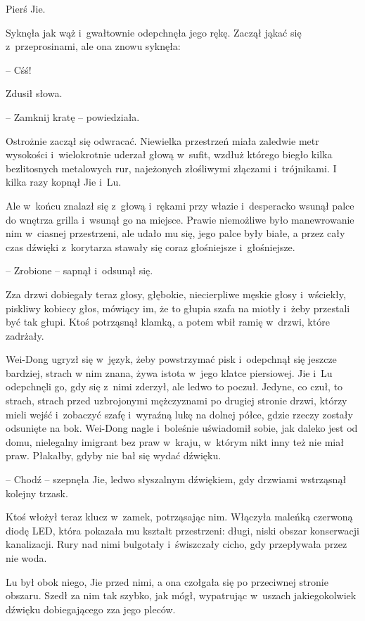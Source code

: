 \documentclass[oneside,polish,11pt,rmheadings]{mwbk}
\begin{document}
Pierś Jie.

Syknęła jak wąż i~gwałtownie odepchnęła jego rękę. Zaczął jąkać się z~przeprosinami, ale ona znowu syknęła: 

-- Cśś!

Zdusił słowa.

-- Zamknij kratę -- powiedziała. 

Ostrożnie zaczął się odwracać. Niewielka przestrzeń miała zaledwie metr wysokości i~wielokrotnie uderzał głową w~sufit, wzdłuż którego biegło kilka bezlitosnych metalowych rur, najeżonych złośliwymi złączami i~trójnikami. I kilka razy kopnął Jie i~Lu.

Ale w~końcu znalazł się z~głową i~rękami przy włazie i~desperacko wsunął palce do wnętrza grilla i~wsunął go na miejsce. Prawie niemożliwe było manewrowanie nim w~ciasnej przestrzeni, ale udało mu się, jego palce były białe, a przez cały czas dźwięki z~korytarza stawały się coraz głośniejsze i~głośniejsze.

-- Zrobione -- sapnął i~odsunął się. 

Zza drzwi dobiegały teraz głosy, głębokie, niecierpliwe męskie głosy i~wściekły, piskliwy kobiecy głos, mówiący im, że to głupia szafa na miotły i~żeby przestali być tak głupi. Ktoś potrząsnął klamką, a potem wbił ramię w~drzwi, które zadrżały.

Wei-Dong ugryzł się w~język, żeby powstrzymać pisk i~odepchnął się jeszcze bardziej, strach w nim znana, żywa istota w~jego klatce piersiowej. Jie i~Lu odepchnęli go, gdy się z~nimi zderzył, ale ledwo to poczuł. Jedyne, co czuł, to strach, strach przed uzbrojonymi mężczyznami po drugiej stronie drzwi, którzy mieli wejść i~zobaczyć szafę i~wyraźną lukę na dolnej półce, gdzie rzeczy zostały odsunięte na bok. Wei-Dong nagle i~boleśnie uświadomił sobie, jak daleko jest od domu, nielegalny imigrant bez praw w~kraju, w~którym nikt inny też nie miał praw. Płakałby, gdyby nie bał się wydać dźwięku.

-- Chodź -- szepnęła Jie, ledwo słyszalnym dźwiękiem, gdy drzwiami wstrząsnął kolejny trzask.

 Ktoś włożył teraz klucz w~zamek, potrząsając nim. Włączyła maleńką czerwoną diodę LED, która pokazała mu kształt przestrzeni: długi, niski obszar konserwacji kanalizacji. Rury nad nimi bulgotały i~świszczały cicho, gdy przepływała przez nie woda.

Lu był obok niego, Jie przed nimi, a ona czołgała się po przeciwnej stronie obszaru. Szedł za nim tak szybko, jak mógł, wypatrując w~uszach jakiegokolwiek dźwięku dobiegającego zza jego pleców.
\end{document}
